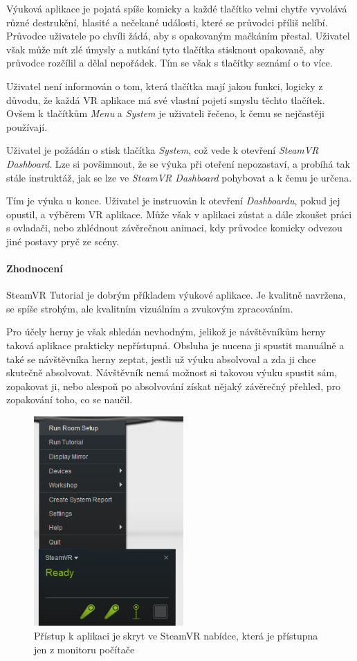 Výuková aplikace je pojatá spíše komicky a každé tlačítko velmi chytře
vyvolává různé destrukční, hlasité a nečekané události, které se
průvodci příliš nelíbí. Průvodce uživatele po chvíli žádá, aby s opakovaným
mačkáním přestal. Uživatel však může mít zlé úmysly a nutkání tyto tlačítka
stisknout opakovaně, aby průvodce rozčílil a dělal nepořádek. Tím se
však s tlačítky seznámí o to více.

Uživatel není informován o tom, která tlačítka mají jakou funkci, logicky z
důvodu, že každá VR aplikace má své vlastní pojetí smyslu těchto
tlačítek. Ovšem k tlačítkům \emph{Menu} a \emph{System} je uživateli
řečeno, k čemu se nejčastěji používají.

Uživatel je požádán o stisk tlačítka \emph{System}, což vede k otevření
\emph{SteamVR Dashboard}. Lze si povšimnout, že se výuka při oteření
nepozastaví, a probíhá tak stále instruktáž, jak se lze ve \emph{SteamVR
Dashboard} pohybovat a k čemu je určena.

Tím je výuka u konce. Uživatel je instruován k otevření
\emph{Dashboardu}, pokud jej opustil, a výběrem VR aplikace. Může však v
aplikaci zůstat a dále zkoušet práci s ovladači, nebo zhlédnout
závěrečnou animaci, kdy průvodce komicky odvezou jiné postavy pryč ze
scény. \autocite{steamvrshuts}

\paragraph{Zhodnocení}\label{zhodnocenuxed}

SteamVR Tutorial je dobrým příkladem výukové aplikace. Je kvalitně
navržena, se spíše strohým, ale kvalitním vizuálním a zvukovým
zpracováním.

Pro účely herny je však shledán nevhodným, jelikož je návštěvníkům herny
taková aplikace prakticky nepřístupná. Obsluha je nucena ji spustit
manuálně a také se návštěvníka herny zeptat, jestli už výuku absolvoval
a zda ji chce skutečně absolvovat. Návštěvník nemá možnost si takovou
výuku spustit sám, zopakovat ji, nebo alespoň po absolvování získat
nějaký závěrečný přehled, pro zopakování toho, co se naučil.

\begin{figure}
\centering
\includegraphics[height=8cm]{src/assets/hidden-menu.png}
\caption{Přístup k aplikaci je skryt ve SteamVR nabídce, která je
přístupna jen z monitoru počítače}
\end{figure}


